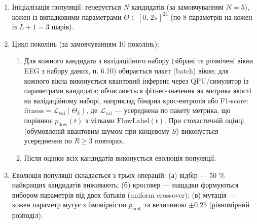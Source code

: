 \documentclass[12pt,a4paper]{article}
\begin{document}
\begin{enumerate}

\def\labelenumi{\arabic{enumi}.}

\item

  Ініціалізація популяції: генерується \(N\) кандидатів (за замовчуванням \(N = 5\)), кожен із випадковими параметрами \(\Theta \in [0,\,2\pi]^{24}\) (по 8 параметрів на кожен із \(L + 1 = 3\) шарів).

\item

  Цикл поколінь (за замовчуванням 10 поколінь):



  \begin{enumerate}

  \def\labelenumii{\alph{enumii}.}

  \tightlist

  \item

    Для кожного кандидата з валідаційного набору (зібрані та розмічені вікна EEG з набору даних, п. 6.10) обирається пакет (batch) вікон; для кожного вікна виконується квантовий інференс через QPU/симулятор із параметрами кандидата; обчислюється фітнес-значення як метрика якості на валідаційному наборі, наприклад бінарна крос-ентропія або F1-score: \(\text{fitness} = \mathcal{L}_{\text{val}}(\Theta_k)\), де \(\mathcal{L}_{\text{val}}\) --- усереднена по пакету метрика, що порівнює \(p_{\text{flow}}(t)\) з мітками \(\text{FlowLabel}(t)\). При стохастичній оцінці (обумовленій квантовим шумом при кінцевому \(S\)) виконується усереднення по \(R \geq 3\) повторах.

  \item

    Після оцінки всіх кандидатів виконується еволюція популяції.

  \end{enumerate}

\item

  Еволюція популяції складається з трьох операцій: (а) відбір --- 50 \% найкращих кандидатів виживають; (б) кросовер --- нащадки формуються вибором параметрів від двох батьків (uniform crossover); (в) мутація --- кожен параметр мутує з ймовірністю \(p_{\text{mut}}\) та величиною \(\pm 0.25\) (рівномірний розподіл).

\end{enumerate}
\end{document}
